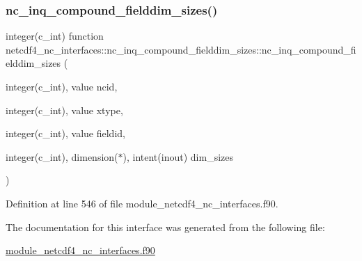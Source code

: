 \subsubsection{\texorpdfstring{nc\+\_\+inq\+\_\+compound\+\_\+fielddim\+\_\+sizes()}{nc\_inq\_compound\_fielddim\_sizes()}}
{\footnotesize\ttfamily integer(c\+\_\+int) function netcdf4\+\_\+nc\+\_\+interfaces\+::nc\+\_\+inq\+\_\+compound\+\_\+fielddim\+\_\+sizes\+::nc\+\_\+inq\+\_\+compound\+\_\+fielddim\+\_\+sizes (\begin{DoxyParamCaption}\item[{integer(c\+\_\+int), value}]{ncid,  }\item[{integer(c\+\_\+int), value}]{xtype,  }\item[{integer(c\+\_\+int), value}]{fieldid,  }\item[{integer(c\+\_\+int), dimension($\ast$), intent(inout)}]{dim\+\_\+sizes }\end{DoxyParamCaption})}



Definition at line 546 of file module\+\_\+netcdf4\+\_\+nc\+\_\+interfaces.\+f90.



The documentation for this interface was generated from the following file\+:\begin{DoxyCompactItemize}
\item 
\hyperlink{module__netcdf4__nc__interfaces_8f90}{module\+\_\+netcdf4\+\_\+nc\+\_\+interfaces.\+f90}\end{DoxyCompactItemize}
